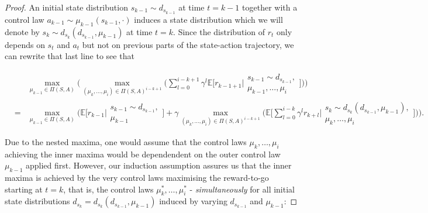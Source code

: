 \documentclass[11pt]{article} %
\begin{document}
\begin{proof}
An initial state distribution $s_{k-1} \sim d_{s_{k-1}}$ at time $t = k-1$ together with a control law $a_{k-1} \sim \mu_{k-1}(s_{k-1},\cdot)$ induces a state distribution which we will denote by $s_k \sim d_{s_k}(d_{s_{k-1}},\mu_{k-1}) $ at time $t = k$. Since the distribution of $r_t$ only depends on $s_t$ and $a_t$ but not on previous parts of the state-action trajectory, we can rewrite that last line to see that

\begin{equation}
	\begin{array}{rcl}
		& 	 &	\max\limits_{\mu_{k-1} \in \Pi(S,A)} \Big( \max\limits_{(\mu_k,\dots,\mu_i) \in \Pi(S,A)^{i-k+1}} \Big( \sum\limits_{l=0}^{i-k+1} \gamma^l \mathbb{E}\Big[ r_{k-1+1} \Big| 	\begin{array}{c}
																																																s_{k-1} \sim d_{s_{k-1}}, \\
																																																\mu_{k-1},\dots,\mu_i
																																															\end{array} \Big] \Big) \Big) \\
		& =	&	\max\limits_{\mu_{k-1} \in \Pi(S,A)} \Big( \mathbb{E}\Big[ r_{k-1} \Big| \begin{array}{c}
																						s_{k-1} \sim d_{s_{k-1}}, \\
																						\mu_{k-1}
																					\end{array} \Big]  + \gamma \max\limits_{(\mu_k,\dots,\mu_i) \in \Pi(S,A)^{i-k+1}} \Big( \mathbb{E} \Big[ \sum\limits_{l=0}^{i-k} \gamma^l r_{k+l} \Big| \begin{array}{c}
																																																s_k \sim d_{s_k}(d_{s_{k-1}},\mu_{k-1}), \\
																																																\mu_k,\dots,\mu_i
																																															\end{array} \Big] \Big) \Big).
	\end{array}
\end{equation}

Due to the nested maxima, one would assume that the control laws $\mu_k,\dots,\mu_i$ achieving the inner maxima would be dependendent on the outer control law $\mu_{k-1}$ applied first. However, our induction assumption assures us that the inner maxima is achieved by the very control laws maximising the reward-to-go starting at $t = k$, that is, the control laws $\mu_k^*,\dots,\mu_i^*$ - \textit{simultaneously} for all initial state distributions $d_{s_k} = d_{s_k}(d_{s_{k-1}},\mu_{k-1})$ induced by varying $d_{s_{k-1}}$ and $\mu_{k-1}$:


\end{proof}
\end{document}
